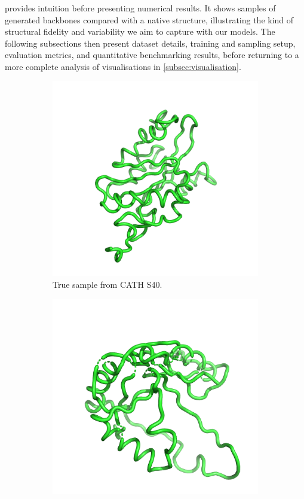 \documentclass[a4paper,12pt]{article}
\begin{document}
 provides intuition before presenting numerical results. It shows samples of generated backbones compared with a native structure, illustrating the kind of structural fidelity and variability we aim to capture with our models. The following subsections then present dataset details, training and sampling setup, evaluation metrics, and quantitative benchmarking results, before returning to a more complete analysis of visualisations in \cref{subsec:visualisation}.

\begin{figure}[htbp]
    \centering
    \begin{subfigure}[b]{0.495\textwidth}
        \centering
        \includegraphics[width=\linewidth]{1ak6A00_true.png}
        \caption{True sample from CATH S40.}
        \label{fig:sample-true}
    \end{subfigure}
    \begin{subfigure}[b]{0.495\textwidth}
        \centering
        \includegraphics[width=0.95\linewidth]{1ak6A00_gen_unet.png}

\end{subfigure}
\end{figure}
\end{document}
